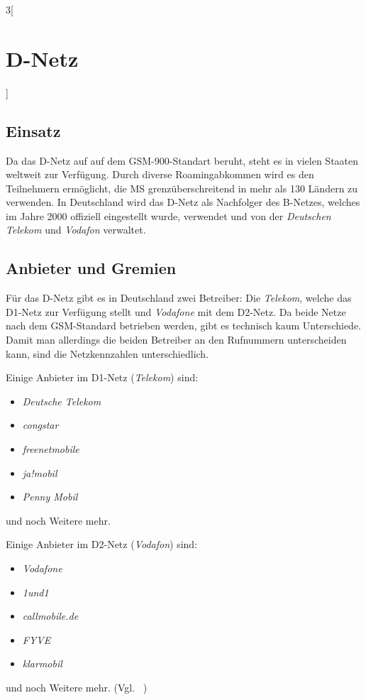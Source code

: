 \begin{multicols}{3}[\section{D-Netz}]
\subsection*{Einsatz}
Da das D-Netz auf auf dem GSM-900-Standart beruht, steht es in vielen Staaten weltweit zur Verfügung. Durch diverse Roamingabkommen wird es den Teilnehmern ermöglicht, die MS grenzüberschreitend in mehr als 130 Ländern zu verwenden. In Deutschland wird das D-Netz als Nachfolger des B-Netzes, welches im Jahre 2000 offiziell eingestellt wurde, verwendet und von der \textit{Deutschen Telekom} und \textit{Vodafon} verwaltet. 




\subsection*{Anbieter und Gremien}
Für das D-Netz gibt es in Deutschland zwei Betreiber: Die \textit{Telekom}, welche das D1-Netz zur Verfügung stellt und \textit{Vodafone} mit dem D2-Netz. Da beide Netze nach dem GSM-Standard betrieben werden, gibt es technisch kaum Unterschiede. Damit man allerdings die beiden Betreiber an den Rufnummern unterscheiden kann, sind die Netzkennzahlen unterschiedlich.

Einige Anbieter im D1-Netz (\textit{Telekom}) sind:

\begin{itemize}
\item \textit{Deutsche Telekom}
\item \textit{congstar}
\item \textit{freenetmobile}
\item \textit{ja!mobil}
\item \textit{Penny Mobil}
\end{itemize}
und noch Weitere mehr. \newline

Einige Anbieter im D2-Netz (\textit{Vodafon}) sind:

\begin{itemize}
\item \textit{Vodafone}
\item \textit{1und1}
\item \textit{callmobile.de}
\item \textit{FYVE}
\item \textit{klarmobil}
\end{itemize}
und noch Weitere mehr.
(Vgl. ~\cite{DNetz.1})




\end{multicols}
\newpage
